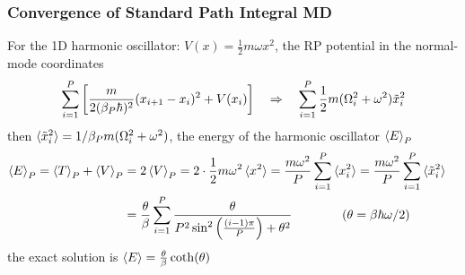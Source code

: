 \begin{frame}
  \frametitle{Convergence of Standard Path Integral MD}

  For the 1D harmonic oscillator: $V(x) = \frac{1}{2}m\omega x^2$, the RP
  potential in the normal-mode coordinates
  \begin{equation*}
    \sum_{i=1}^P \left[
    {m\over2(\beta_P\hbar)^2} (x_{\tikzmark{ring_polymer_bc} i+1} - x_i)^2
    +
    V(x_i)
    \right]
          \quad\Rightarrow\quad
    \sum_{i=1}^P {1\over2}m(\Omega_i^2 + \omega^2)\tilde{x}_i^2
  \end{equation*}
  then $\braket{\tilde{x}_i^2} = 1 / \beta_P m(\Omega_i^2 + \omega^2)$, the energy
  of the harmonic oscillator $\braket{E}_P $
  \begin{align*}
    \braket{E}_P = \braket{T}_P + \braket{V}_P &= 2\braket{V}_P = 2\cdot {1\over2}m\omega^2\braket{x^2} =
                                                           {m\omega^2\over P}
                                                           \sum_{i=1}^P\braket{x_i^2}
                                                           = 
                                                           {m\omega^2\over P}
                                                           \sum_{i=1}^P\braket{\tilde{x}_i^2}
                                                           \cr
                                                           &=
                                                             \frac{\theta}{\beta}
                                                             \sum_{i=1}^P \frac{
                                                             \theta
                                                             }{
                                                             P^2\sin^2\left({(i-1)\pi\over
                                                             P}\right) + \theta^2
                                                             }\qquad\qquad
                                                             (\theta = \beta\hbar\omega / 2)
  \end{align*}
  the exact solution is $\braket{E} = {\theta\over\beta}\coth(\theta)$

  \begin{multicols}{2}
    \begin{itemize}


\end{itemize}
\end{multicols}
\end{frame}
